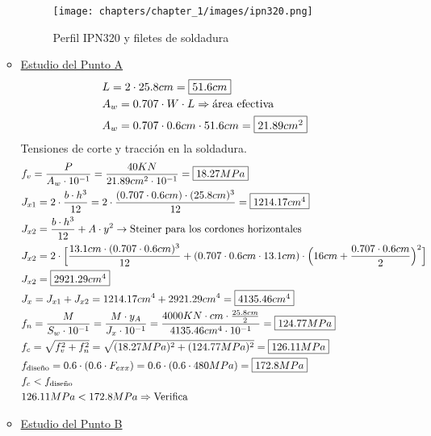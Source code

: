 \begin{enumerate}
\begin{itemize}
\begin{figure}[H]
\begin{center}
     \texttt{[image: chapters/chapter\_1/images/ipn320.png]}
\end{center}
\caption{Perfil IPN320 y filetes de soldadura}
\end{figure}
\item \underline{Estudio del Punto A}
\begin{align*}
& L = 2 \cdot 25.8cm = \framebox{$51.6cm$} \\
& A_w = 0.707 \cdot W \cdot L \Rightarrow \text{área efectiva} \\
& A_w = 0.707 \cdot 0.6 cm \cdot 51.6cm = \framebox{$21.89 cm^2$} \\
\end{align*}
\newpage
Tensiones de corte y tracción en la soldadura.\\
\begin{align*}
& f_v = \frac{P}{A_w \cdot 10^{-1}} = \frac{40KN}{21.89cm^2 \cdot 10^{-1}} = \framebox{$18.27MPa$} \\
& J_{x1} = 2 \cdot \frac{b \cdot h^3}{12} = 2 \cdot \frac{(0.707 \cdot 0.6cm) \cdot (25.8cm)^3}{12} = \framebox{$1214.17cm^4$} \\
& J_{x2} = \frac{b \cdot h^3}{12} + A \cdot y^2 \rightarrow \text{Steiner para los cordones horizontales} \\
& J_{x2} = 2 \cdot \Big[\frac{13.1cm \cdot (0.707 \cdot 0.6cm)^3}{12} + (0.707 \cdot 0.6cm \cdot 13.1cm) \cdot \Big(16cm+ \frac{0.707 \cdot 0.6cm}{2}\Big)^2\Big] \\
& J_{x2} = \framebox{$2921.29cm^4$} \\
& J_x = J_{x1} + J_{x2} = 1214.17cm^4 + 2921.29cm^4 = \framebox{$4135.46cm^4$} \\
& f_n = \frac{M}{S_w \cdot 10^{-1}} = \frac{M \cdot y_A}{J_x \cdot 10^{-1}} = \frac{4000 KN \cdot cm \cdot \frac{25.8cm}{2}}{4135.46cm^4 \cdot 10^{-1}} = \framebox{$124.77MPa$} \\
& f_c = \sqrt{f_v^2 + f_n^2} = \sqrt{(18.27MPa)^2 + (124.77MPa)^2} = \framebox{$126.11MPa$} \\
& f_{\text{diseño}} = 0.6 \cdot (0.6 \cdot F_{exx}) = 0.6 \cdot (0.6 \cdot 480MPa) = \framebox{$172.8MPa$} \\
& f_c < f_{\text{diseño}} \\
& 126.11MPa < 172.8MPa \Rightarrow \text{Verifica}
\end{align*}

\item \underline{Estudio del Punto B}


\end{itemize}
\end{enumerate}
